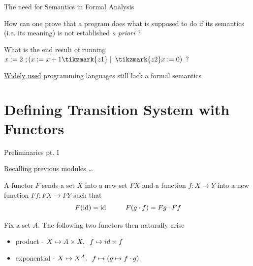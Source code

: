 \documentclass[aspectratio=169]{beamer}
\begin{document}
\begin{frame}{The need for Semantics in Formal Analysis}

  How can one prove that a program does what is supposed to do if its
  semantics (i.e. its meaning) is not established \emph{a priori} ?

  \begin{exampleblock}{\exercise}
    What is the end result of running
    $x:=2\ ; (x := x + 1 \tikzmark{z1}  \parallel  \tikzmark{z2} x := 0)$ ?
  \end{exampleblock}


   \vfill
   \underline{Widely used} programming languages \alert{still} lack a formal
   semantics
\end{frame}


\section{Defining Transition System with Functors}

\begin{frame}{Preliminaries pt. I}

  Recalling previous modules \dots

  \vfill
  \begin{definition}[Functor]
    A functor $F$ sends a set $X$ into a new set $FX$ and a function
    $f : X \to Y$ into a new function $F f : F X \to F Y$ such that
    \[
      F (\mathrm{id}) = \mathrm{id}  \hspace{1cm} F(g \cdot f) = F g \cdot F f
    \]
  \end{definition}

  Fix a set $A$. The following two functors then naturally arise
  \begin{itemize}
  \item product - $X \mapsto A \times X, \hspace{0.2cm} f \mapsto id \times f$
  \item exponential - $X \mapsto X^A, \hspace{0.2cm} f \mapsto (g \mapsto f \cdot g)$
  \end{itemize}
\end{frame}
\end{document}
